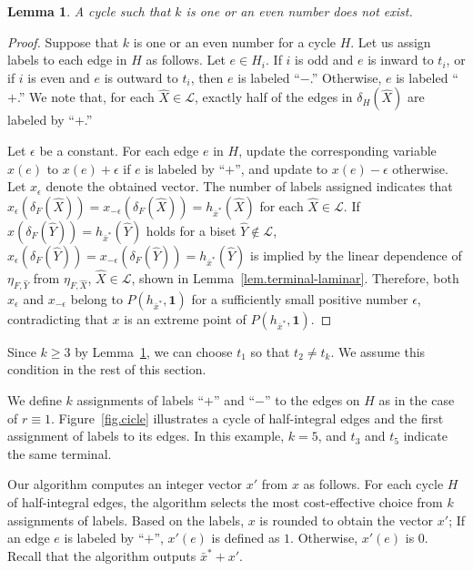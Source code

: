 \documentclass{article}
\newtheorem{lemma}{Lemma}
\newcommand{\Lfam}{\mathcal{L}}
\newcommand{\allone}{\mathbf{1}}
\newcommand{\cut}{P}
\begin{document}
\begin{lemma}\label{lem.even}
A cycle such that $k$ is one or an even number does not exist.
\end{lemma}
\begin{proof}
Suppose that $k$ is one or an even number for a cycle $H$.
 Let us assign labels to each edge in $H$ as follows.
 Let $e \in H_i$.
 If $i$ is odd and $e$ is inward to $t_i$, or if
 $i$ is even and $e$ is outward to $t_i$, 
 then $e$ is labeled ``$-$.''
 Otherwise, $e$ is labeled ``$+$.''
 We note that, for each $\hat{X} \in \Lfam$,
exactly half of the edges  in $\delta_H(\hat{X})$
are labeled by ``$+$.''

 Let $\epsilon$ be a constant. 
 For each edge $e$ in $H$,
 update the corresponding variable $x(e)$ to $x(e)+\epsilon$
 if $e$ is labeled by ``$+$'',
 and update to $x(e)-\epsilon$ otherwise.
Let $x_{\epsilon}$ denote the obtained vector.
The number of labels assigned indicates that 
 $x_{\epsilon}(\delta_F(\hat{X}))=x_{-\epsilon}(\delta_F(\hat{X}))=h_{\bar{x}^*}(\hat{X})$
 for each $\hat{X} \in \Lfam$.
 If
 $x(\delta_F(\hat{Y}))=h_{\bar{x}^*}(\hat{Y})$ holds for a biset
 $\hat{Y} \not\in \Lfam$,
 $x_{\epsilon}(\delta_F(\hat{Y}))=x_{-\epsilon}(\delta_F(\hat{Y}))=h_{\bar{x}^*}(\hat{Y})$
is implied by the linear dependence of $\eta_{F,\hat{Y}}$  from
 $\eta_{F,\hat{X}}$, $\hat{X} \in \Lfam$, shown in Lemma~\ref{lem.terminal-laminar}.
Therefore, both $x_{\epsilon}$ and $x_{-\epsilon}$
 belong to 
$\cut(h_{\bar{x}^*},\allone)$ for a sufficiently small positive number
$\epsilon$,
contradicting that $x$ is an extreme point of $\cut(h_{\bar{x}^*},\allone)$.
\end{proof}

Since $k\geq 3$ by Lemma~\ref{lem.even}, we can choose $t_1$ so that
$t_2 \neq t_k$. We assume this condition in the rest of this section.

We define $k$ assignments of labels ``$+$'' and ``$-$''
to the edges on $H$ as in the case of $r\equiv 1$.
 Figure~\ref{fig.cicle} illustrates 
 a cycle of half-integral edges and the first assignment of labels 
 to its edges. In this example, $k=5$, and $t_3$ and $t_5$ indicate the same terminal.


Our algorithm computes an integer vector $x'$ from $x$ as follows.
For each cycle $H$ of half-integral edges,
the algorithm selects the most cost-effective choice from $k$ assignments of labels.
Based on the labels,
$x$ is rounded to obtain the vector $x'$;
If an edge $e$ is labeled by ``$+$'',  $x'(e)$ is defined as $1$.
Otherwise, $x'(e)$ is $0$.
Recall that the algorithm outputs $\bar{x}^* + x'$.
\end{document}
